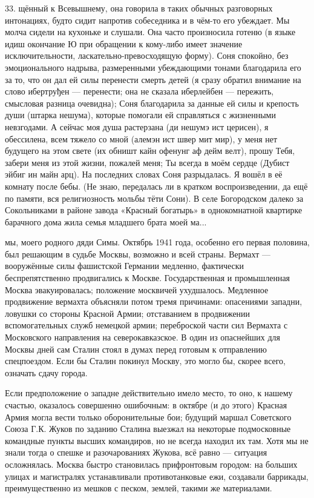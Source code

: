 33. щённый к Всевышнему, она говорила в таких обычных разговорных интонациях, будто сидит напротив собеседника и в чём-то его убеждает. Мы молча сидели на кухоньке и слушали. Она часто произносила готеню (в языке идиш окончание Ю при обращении к кому-либо имеет значение исключительности, ласкательно-превосходящую форму). Соня спокойно, без эмоционального надрыва, размеренными убеждающими тонами благодарила его за то, что он дал ей силы перенести смерть детей (я сразу обратил внимание на слово ибертруђен — перенести; она не сказала иберлейбен — пережить, смысловая разница очевидна); Соня благодарила за данные ей силы и крепость души (штарка нешума), которые помогали ей справляться с жизненными невзгодами. А сейчас моя душа растерзана (ди нешумэ ист церисен), я обессилена, всем тяжело со мной (алемэн ист швер мит мир), у меня нет будущего на этом свете (их обништ кайн офенунг аф дейм велт), прошу Тебя, забери меня из этой жизни, пожалей меня; Ты всегда в моём сердце (Дубист эйбиг ин майн арц). На последних словах Соня разрыдалась. Я вошёл в её комнату после бебы. (Не знаю, передалась ли в кратком воспроизведении, да ещё по памяти, вся религиозность мольбы тёти Сони). В селе Богородском далеко за Сокольниками в районе завода «Красный богатырь» в однокомнатной квартирке барачного дома жила семья младшего брата моей ма...

мы, моего родного дяди Симы. Октябрь 1941 года, особенно его первая половина, был решающим в судьбе Москвы, возможно и всей страны. Вермахт — вооружённые силы фашистской Германии медленно, фактически беспрепятственно продвигались к Москве. Государственная и промышленная Москва эвакуировалась; положение москвичей ухудшалось. Медленное продвижение вермахта объясняли потом тремя причинами: опасениями западни, ловушки со стороны Красной Армии; отставанием в продвижении вспомогательных служб немецкой армии; переброской части сил Вермахта с Московского направления на северокавказское. В один из опаснейших для Москвы дней сам Сталин стоял в думах перед готовым к отправлению спецпоездом. Если бы Сталин покинул Москву, это могло бы, скорее всего, означать сдачу города.

Если предположение о западне действительно имело место, то оно, к нашему счастью, оказалось совершенно ошибочным: в октябре (и до этого) Красная Армия могла вести только оборонительные бои; будущий маршал Советского Союза Г.К. Жуков по заданию Сталина выезжал на некоторые подмосковные командные пункты высших командиров, но не всегда находил их там. Хотя мы не знали тогда о спешке и разочарованиях Жукова, всё равно — ситуация осложнялась. Москва быстро становилась прифронтовым городом: на больших улицах и магистралях устанавливали противотанковые ежи, создавали баррикады, преимущественно из мешков с песком, землей, такими же материалами.

